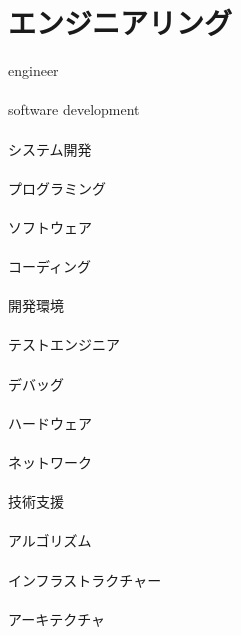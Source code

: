 \clearpage
\section*{エンジニアリング}
engineer
\\\\
software development
\\\\
システム開発
\\\\
プログラミング
\\\\
ソフトウェア
\\\\
コーディング
\\\\
開発環境
\\\\
テストエンジニア
\\\\
デバッグ
\\\\
ハードウェア
\\\\
ネットワーク
\\\\
技術支援
\\\\
アルゴリズム
\\\\
インフラストラクチャー
\\\\
アーキテクチャ
